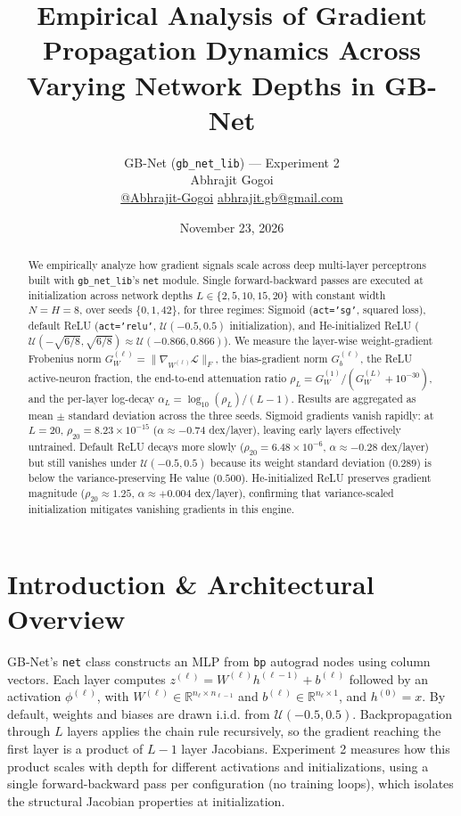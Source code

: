 \documentclass[11pt,a4paper]{article}
\title{\textbf{Empirical Analysis of Gradient Propagation Dynamics Across Varying Network Depths in GB-Net}}
\author{GB-Net (\texttt{gb\_net\_lib}) --- Experiment 2\\[0.5em]
\normalsize Abhrajit Gogoi\\[0.25em]
\normalsize \href{https://github.com/Abhrajit-Gogoi}{@Abhrajit-Gogoi} \quad \href{mailto:abhrajit.gb@gmail.com}{abhrajit.gb@gmail.com}}
\date{November 23, 2026}
\begin{document}
\maketitle

\begin{abstract}
\noindent We empirically analyze how gradient signals scale across deep multi-layer perceptrons built with \texttt{gb\_net\_lib}'s \texttt{net} module. Single forward-backward passes are executed at initialization across network depths $L \in \{2, 5, 10, 15, 20\}$ with constant width $N = H = 8$, over seeds $\{0, 1, 42\}$, for three regimes: Sigmoid (\texttt{act='sg'}, squared loss), default ReLU (\texttt{act='relu'}, $\mathcal{U}(-0.5, 0.5)$ initialization), and He-initialized ReLU ($\mathcal{U}(-\sqrt{6/8}, \sqrt{6/8}) \approx \mathcal{U}(-0.866, 0.866)$). We measure the layer-wise weight-gradient Frobenius norm $G_W^{(\ell)} = \|\nabla_{W^{(\ell)}}\mathcal{L}\|_F$, the bias-gradient norm $G_b^{(\ell)}$, the ReLU active-neuron fraction, the end-to-end attenuation ratio $\rho_L = G_W^{(1)}/(G_W^{(L)} + 10^{-30})$, and the per-layer log-decay $\alpha_L = \log_{10}(\rho_L)/(L-1)$. Results are aggregated as mean $\pm$ standard deviation across the three seeds. Sigmoid gradients vanish rapidly: at $L=20$, $\rho_{20} = 8.23 \times 10^{-15}$ ($\alpha \approx -0.74$ dex/layer), leaving early layers effectively untrained. Default ReLU decays more slowly ($\rho_{20} = 6.48 \times 10^{-6}$, $\alpha \approx -0.28$ dex/layer) but still vanishes under $\mathcal{U}(-0.5, 0.5)$ because its weight standard deviation ($0.289$) is below the variance-preserving He value ($0.500$). He-initialized ReLU preserves gradient magnitude ($\rho_{20} \approx 1.25$, $\alpha \approx +0.004$ dex/layer), confirming that variance-scaled initialization mitigates vanishing gradients in this engine.
\end{abstract}

\section{Introduction \& Architectural Overview}

GB-Net's \texttt{net} class constructs an MLP from \texttt{bp} autograd nodes using column vectors. Each layer computes $z^{(\ell)} = W^{(\ell)} h^{(\ell-1)} + b^{(\ell)}$ followed by an activation $\phi^{(\ell)}$, with $W^{(\ell)} \in \mathbb{R}^{n_\ell \times n_{\ell-1}}$ and $b^{(\ell)} \in \mathbb{R}^{n_\ell \times 1}$, and $h^{(0)} = x$. By default, weights and biases are drawn i.i.d. from $\mathcal{U}(-0.5, 0.5)$. Backpropagation through $L$ layers applies the chain rule recursively, so the gradient reaching the first layer is a product of $L-1$ layer Jacobians. Experiment 2 measures how this product scales with depth for different activations and initializations, using a single forward-backward pass per configuration (no training loops), which isolates the structural Jacobian properties at initialization.
\end{document}
